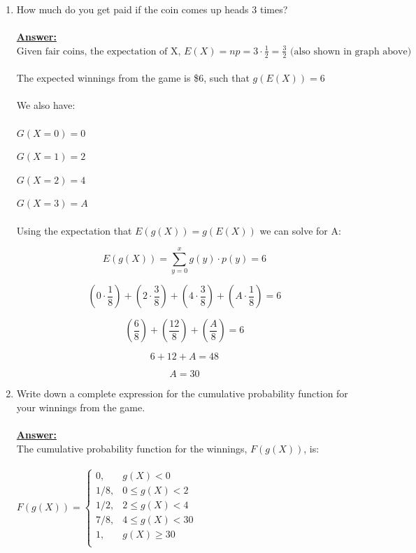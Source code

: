 \documentclass[12pt,a4paper]{article}
\numberwithin{equation}{subsection}
\begin{document}
\begin{enumerate}
\begin{enumerate}
\item How much do you get paid if the coin comes up heads 3 times?
\\
\\
\textbf{\underline{Answer:}}
\\
$\text{Given fair coins, the expectation of X, } E(X) = np = 3 \cdot \frac{1}{2} = \frac{3}{2} \text{ (also shown in graph above)}$
\\
\\
The expected winnings from the game is \$6, such that $g(E(X)) = 6$
\\
\\
We also have:
\\
\\
$G(X=0) = 0$

$G(X=1) = 2$

$G(X=2) = 4$

$G(X=3) = A$
\\
\\
Using the expectation that $E(g(X)) = g(E(X))$ we can solve for A:

$$E(g(X)) = \sum_{y=0}^x g(y) \cdot p(y) = 6$$

$$(0 \cdot \frac{1}{8}) + (2 \cdot \frac{3}{8}) + (4 \cdot \frac{3}{8}) +  (A \cdot \frac{1}{8} ) = 6$$

$$(\frac{6}{8}) + (\frac{12}{8}) + (\frac{A}{8}) = 6$$

$$6 + 12 + A = 48$$

$$A = 30$$


\item Write down a complete expression for the cumulative probability function for your winnings from the game.
\\
\\
\textbf{\underline{Answer:}}
\\
The cumulative probability function for the winnings, $F(g(X))$, is:
\\
\\
$F(g(X)) = \begin{cases}
0, &g(X) < 0 \\
1/8,  &0 \leq g(X) < 2 \\
1/2, &2 \leq g(X) < 4 \\
7/8, &4 \leq g(X) < 30 \\
1, &g(X) \geq 30\\
\end{cases}$


\end{enumerate}
\end{enumerate}
\end{document}

